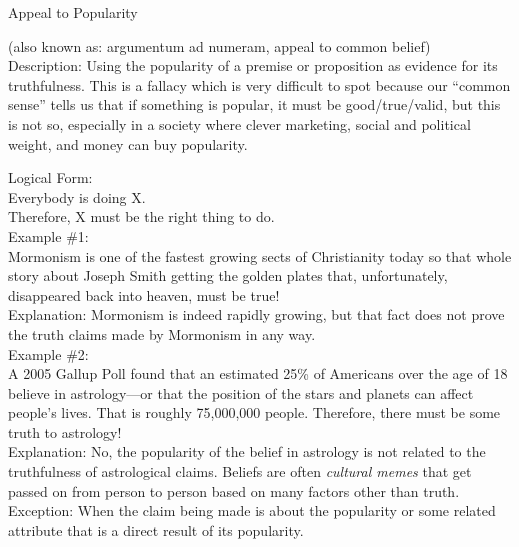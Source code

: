 \documentclass[a4paper,12pt,single,pdftex]{scrartcl}
\begin{document}
  

Appeal to Popularity
    
      (also known as: argumentum ad numeram, appeal to common belief)
    \\

  
    Description: Using the popularity of a premise or proposition as evidence for its truthfulness.  This is a fallacy which is very difficult to spot because our “common sense” tells us that if something is popular, it must be good/true/valid, but this is not so, especially in a society where clever marketing, social and political weight, and money can buy popularity.

    
      Logical Form:
    \\

    
      Everybody is doing X.
    \\

    
      Therefore, X must be the right thing to do.
    \\

    
      Example \#1: 
    \\

    
      Mormonism is one of the fastest growing sects of Christianity today so that whole story about Joseph Smith getting the golden plates that, unfortunately, disappeared back into heaven, must be true!
    \\

    
      Explanation: Mormonism is indeed rapidly growing, but that fact does not prove the truth claims made by Mormonism in any way.
    \\

    
      Example \#2: 
    \\

    
      A 2005 Gallup Poll found that an estimated 25\% of Americans over the age of 18 believe in astrology—or that the position of the stars and planets can affect people's lives.  That is roughly 75,000,000 people.  Therefore, there must be some truth to astrology!
    \\

    
      Explanation: No, the popularity of the belief in astrology is not related to the truthfulness of astrological claims.  Beliefs are often {\it cultural memes} that get passed on from person to person based on many factors other than truth. 
    \\

    
      Exception: When the claim being made is about the popularity or some related attribute that is a direct result of its popularity.
    \\
\end{document}
